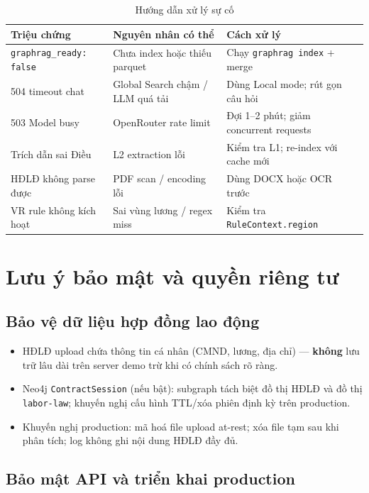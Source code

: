 \documentclass[../DoAn.tex]{subfiles}
\begin{document}
\begin{table}[H]
\centering
\caption{Hướng dẫn xử lý sự cố}
\label{table:troubleshooting}
\small
\begin{tabular}{|p{4cm}|p{4.5cm}|p{4cm}|}
\hline
\textbf{Triệu chứng} & \textbf{Nguyên nhân có thể} & \textbf{Cách xử lý} \\
\hline
\texttt{graphrag\_ready: false} & Chưa index hoặc thiếu parquet & Chạy \texttt{graphrag index} + merge \\
504 timeout chat & Global Search chậm / LLM quá tải & Dùng Local mode; rút gọn câu hỏi \\
503 Model busy & OpenRouter rate limit & Đợi 1--2 phút; giảm concurrent requests \\
Trích dẫn sai Điều & L2 extraction lỗi & Kiểm tra L1; re-index với cache mới \\
HĐLĐ không parse được & PDF scan / encoding lỗi & Dùng DOCX hoặc OCR trước \\
VR rule không kích hoạt & Sai vùng lương / regex miss & Kiểm tra \texttt{RuleContext.region} \\
\hline
\end{tabular}
\end{table}

\section{Lưu ý bảo mật và quyền riêng tư}
\label{section:7.4}

\subsection{Bảo vệ dữ liệu hợp đồng lao động}
\label{subsection:7.4.1}

\begin{itemize}[nosep, leftmargin=*]
    \item HĐLĐ upload chứa thông tin cá nhân (CMND, lương, địa chỉ) --- \textbf{không} lưu trữ lâu dài trên server demo trừ khi có chính sách rõ ràng.
    \item Neo4j \texttt{ContractSession} (nếu bật): subgraph tách biệt đồ thị HĐLĐ và đồ thị \texttt{labor-law}; khuyến nghị cấu hình TTL/xóa phiên định kỳ trên production.
    \item Khuyến nghị production: mã hoá file upload at-rest; xóa file tạm sau khi phân tích; log không ghi nội dung HĐLĐ đầy đủ.
\end{itemize}

\subsection{Bảo mật API và triển khai production}
\label{subsection:7.4.2}
\end{document}
